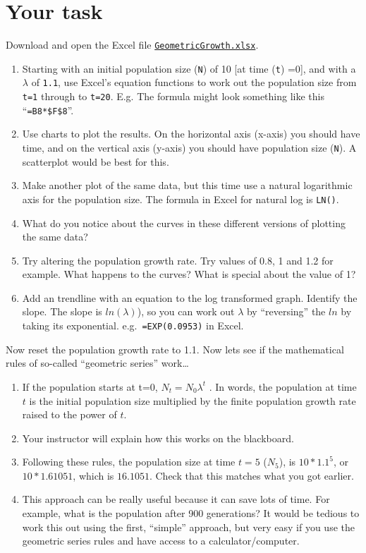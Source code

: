 \documentclass[
  a4paper]{book}
\providecommand{\tightlist}{%
  \setlength{\itemsep}{0pt}\setlength{\parskip}{0pt}}
\begin{document}
\hypertarget{your-task-1}{%
\section{Your task}\label{your-task-1}}

Download and open the Excel file \href{https://www.dropbox.com/s/xxx05sckvop5i52/GeometricGrowth.xlsx?dl=1}{\texttt{GeometricGrowth.xlsx}}.

\begin{enumerate}
\def\labelenumi{\arabic{enumi}.}
\tightlist
\item
  Starting with an initial population size (\texttt{N}) of 10 {[}at time (\texttt{t}) =0{]}, and with a \(\lambda\) of \texttt{1.1}, use Excel's equation functions to work out the population size from \texttt{t=1} through to \texttt{t=20}. E.g. The formula might look something like this ``\texttt{=B8*\$F\$8}''.
\item
  Use charts to plot the results. On the horizontal axis (x-axis) you should have time, and on the vertical axis (y-axis) you should have population size (\texttt{N}). A scatterplot would be best for this.
\item
  Make another plot of the same data, but this time use a natural logarithmic axis for the population size. The formula in Excel for natural log is \texttt{LN()}.
\item
  What do you notice about the curves in these different versions of plotting the same data?
\item
  Try altering the population growth rate. Try values of 0.8, 1 and 1.2 for example. What happens to the curves? What is special about the value of 1?
\item
  Add an trendline with an equation to the log transformed graph. Identify the slope. The slope is \(ln(\lambda)\)), so you can work out \(\lambda\) by ``reversing'' the \(ln\) by taking its exponential. e.g.~\texttt{=EXP(0.0953)} in Excel.
\end{enumerate}

Now reset the population growth rate to 1.1. Now lets see if the mathematical rules of so-called ``geometric series'' work\ldots{}

\begin{enumerate}
\def\labelenumi{\arabic{enumi}.}
\tightlist
\item
  If the population starts at t=0, \(N_t = N_0 \lambda^t\) . In words, the population at time \(t\) is the initial population size multiplied by the finite population growth rate raised to the power of \(t\).
\item
  Your instructor will explain how this works on the blackboard.
\item
  Following these rules, the population size at time \(t=5\) (\(N_5\)), is \(10 * 1.1^5\), or \(10* 1.61051\), which is \(16.1051\). Check that this matches what you got earlier.
\item
  This approach can be really useful because it can save lots of time. For example, what is the population after 900 generations? It would be tedious to work this out using the first, ``simple'' approach, but very easy if you use the geometric series rules and have access to a calculator/computer.
\end{enumerate}
\end{document}
